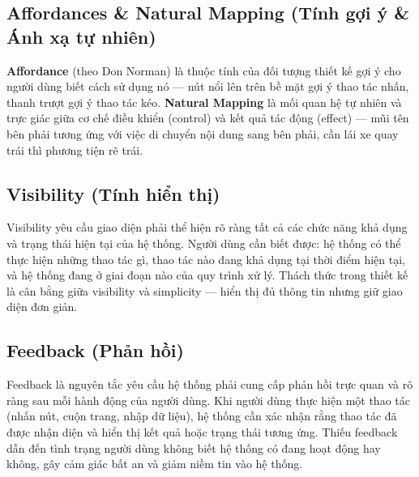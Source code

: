 \subsection{Affordances \& Natural Mapping (Tính gợi ý \& Ánh xạ tự nhiên)}

\textbf{Affordance} (theo Don Norman) là thuộc tính của đối tượng thiết kế gợi ý cho người dùng biết cách sử dụng nó --- nút nổi lên trên bề mặt gợi ý thao tác nhấn, thanh trượt gợi ý thao tác kéo. \textbf{Natural Mapping} là mối quan hệ tự nhiên và trực giác giữa cơ chế điều khiển (control) và kết quả tác động (effect) --- mũi tên bên phải tương ứng với việc di chuyển nội dung sang bên phải, cần lái xe quay trái thì phương tiện rẽ trái.

\subsection{Visibility (Tính hiển thị)}

Visibility yêu cầu giao diện phải thể hiện rõ ràng tất cả các chức năng khả dụng và trạng thái hiện tại của hệ thống. Người dùng cần biết được: hệ thống có thể thực hiện những thao tác gì, thao tác nào đang khả dụng tại thời điểm hiện tại, và hệ thống đang ở giai đoạn nào của quy trình xử lý. Thách thức trong thiết kế là cân bằng giữa visibility và simplicity --- hiển thị đủ thông tin nhưng giữ giao diện đơn giản.

\subsection{Feedback (Phản hồi)}

Feedback là nguyên tắc yêu cầu hệ thống phải cung cấp phản hồi trực quan và rõ ràng sau mỗi hành động của người dùng. Khi người dùng thực hiện một thao tác (nhấn nút, cuộn trang, nhập dữ liệu), hệ thống cần xác nhận rằng thao tác đã được nhận diện và hiển thị kết quả hoặc trạng thái tương ứng. Thiếu feedback dẫn đến tình trạng người dùng không biết hệ thống có đang hoạt động hay không, gây cảm giác bất an và giảm niềm tin vào hệ thống.
